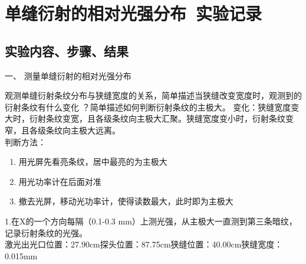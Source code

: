 \documentclass[dvipsnames, svgnames,a4paper,11pt]{article}
\begin{document}
\section{单缝衍射的相对光强分布\ \textbf{实验记录}}
\subsection{实验内容、步骤、结果}
\noindent 一、	测量单缝衍射的相对光强分布
\begin{question}
    观测单缝衍射条纹分布与狭缝宽度的关系，简单描述当狭缝改变宽度时，观测到的衍射条纹有什么变化 ？简单描述如何判断衍射条纹的主极大。
    \tcblower
    变化：狭缝宽度变大时，衍射条纹变宽，且各级条纹向主极大汇聚。狭缝宽度变小时，衍射条纹变窄，且各级条纹向主极大远离。\\
	判断方法：\begin{enumerate}
		\item 用光屏先看亮条纹，居中最亮的为主极大
		\item 用光功率计在后面对准
		\item 撤去光屏，移动光功率计，使得读数最大，此时即为主极大
	\end{enumerate}
\end{question}
\noindent 1.在X的一个方向每隔（0.1-0.3 mm）上测光强，从主极大一直测到第三条暗纹，记录衍射条纹的光强。\\
激光出光口位置：27.90cm\hspace{4pt}探头位置：87.75cm\hspace{4pt}狭缝位置：40.00cm\hspace{4pt}狭缝宽度：0.015mm
\end{document}
